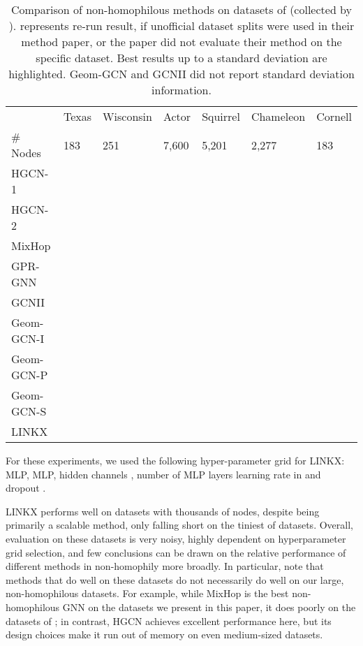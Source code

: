 \documentclass{article}
\newcommand{\bestcell}{\cellcolor{blue!25}}
\begin{document}
\begin{table}[ht]
    \vspace{-5pt}
    \centering
	\caption{Comparison of non-homophilous methods on datasets of  \citet{pei2019geom} (collected by \cite{rozemberczki2019multi, tang2009social, mitchell1997web}).  represents re-run result, if unofficial dataset splits were used in their method paper, or  the paper did not evaluate their method on the specific dataset. Best results up to a standard deviation are highlighted. Geom-GCN and GCNII did not report standard deviation information. } 
	\label{tab:gcn_results}
    {\tiny
    \begin{tabular}{lllllll}
    \toprule
	 & Texas & Wisconsin & Actor & Squirrel & Chameleon & Cornell  \\
	 \# Nodes & 183 & 251 & 7,600 & 5,201 & 2,277 & 183  \\
    \midrule
	 HGCN-1 & \bestcell  & \bestcell  & \bestcell  &  &  & \bestcell  \\
	 HGCN-2 &  & \bestcell  & \bestcell  &  &  & \bestcell   \\
	 MixHop &  &  &  &  &  & \\ 
	 GPR-GNN &   &  &  &  &  &  \\ 
	 GCNII &  &  &   &  &   &  \\
	 Geom-GCN-I &  &  &  &  &  & \\ 
	 Geom-GCN-P &  &  &  &  &  &  \\
	 Geom-GCN-S &  &  &  &  &  & \\ 
	 \midrule
	LINKX &  &  & \bestcell  & \bestcell  & \bestcell  &   \\
	 \bottomrule
    \end{tabular}
    }
\end{table}

For these experiments, we used the following hyper-parameter grid for LINKX: MLP, MLP, hidden channels , number of MLP layers  learning rate in  and dropout  . 

LINKX performs well on datasets with thousands of nodes, despite being primarily a scalable method, only falling short on the tiniest of datasets. Overall, evaluation on these datasets is very noisy, highly dependent on hyperparameter grid selection, and few conclusions can be drawn on the relative performance of different methods in non-homophily more broadly. In particular, note that methods that do well on these datasets do not necessarily do well on our large, non-homophilous datasets. For example, while MixHop is the best non-homophilous GNN on the datasets we present in this paper, it does poorly on the datasets of \citet{pei2019geom}; in contrast, HGCN achieves excellent performance here, but its design choices make it run out of memory on even medium-sized datasets. 
\end{document}
